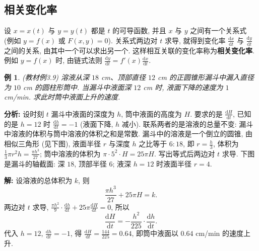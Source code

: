 \documentclass[UTF8,openany]{ctexbook}
\theoremstyle{chinesetextbook}
\newtheorem{example}{例}[section]
\newenvironment{cnsolution}{\par\indent\textbf{解:} \ignorespaces}{\par}
\newcommand{\dd}{\mathrm d}
\begin{document}
\subsection{相关变化率}
设 $x=x(t)$ 与 $y=y(t)$ 都是 $t$ 的可导函数, 并且 $x$ 与 $y$ 之间有一个关系式 (例如 $y=f(x)$ 或 $F(x,y)=0$). 关系式两边对 $t$ 求导, 就得到变化率 $\displaystyle\frac{\dd x}{\dd t}$ 与 $\displaystyle\frac{\dd y}{\dd t}$ 之间的关系, 由其中一个可以求出另一个. 这样相互关联的变化率称为\textbf{相关变化率}. 例如 $y=f(x)$ 时, 由链式法则 $\displaystyle\frac{\dd y}{\dd t}=f'(x)\frac{\dd x}{\dd t}$.
\begin{example}\label{ex:c2-3-9}
\textnormal{(教材例3.9)} 溶液从深 $18$ cm、顶部直径 $12$ cm 的正圆锥形漏斗中漏入直径为 $10$ cm 的圆柱形筒中. 当漏斗中液面深 $12$ cm 时, 液面下降的速度为 $1$ cm/min. 求此时筒中液面上升的速度.
\end{example}
\par\indent\textbf{分析:} 设时刻 $t$ 漏斗中液面的深度为 $h$, 筒中液面的高度为 $H$. 要求的是 $\displaystyle\frac{\dd H}{\dd t}$, 已知的是 $h=12$ 时 $\displaystyle\frac{\dd h}{\dd t}=-1$ (液面下降, $h$ 减小). 联系两者的是溶液的总量不变: 漏斗中溶液的体积与筒中溶液的体积之和是常数. 漏斗中的溶液是一个倒立的圆锥, 由相似三角形 (见下图), 液面半径 $r$ 与深度 $h$ 之比等于 $6:18$, 即 $\displaystyle r=\frac h3$, 体积为 $\displaystyle\frac13\pi r^2h=\frac{\pi h^3}{27}$; 筒中溶液的体积为 $\pi\cdot5^2\cdot H=25\pi H$. 写出等式后两边对 $t$ 求导. 下图是漏斗的轴截面: 深 $18$, 顶部半径 $6$; 液深 $h=12$ 时液面半径 $r=4$.
\begin{center}
\end{center}
\begin{cnsolution}
设溶液的总体积为 $k$, 则
\[
\frac{\pi h^3}{27}+25\pi H=k.
\]
两边对 $t$ 求导, $\displaystyle\frac{\pi h^2}9\cdot\frac{\dd h}{\dd t}+25\pi\frac{\dd H}{\dd t}=0$, 所以
\[
\frac{\dd H}{\dd t}=-\frac{h^2}{225}\cdot\frac{\dd h}{\dd t}.
\]
代入 $h=12$, $\displaystyle\frac{\dd h}{\dd t}=-1$, 得 $\displaystyle\frac{\dd H}{\dd t}=\frac{144}{225}=0.64$, 即筒中液面以 $0.64$ cm/min 的速度上升.
\end{cnsolution}
\end{document}
